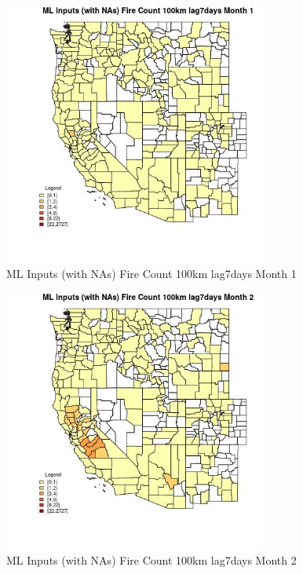 \clearpage 

\begin{figure} 
\centering  
\includegraphics[width=0.77\textwidth]{Code_Outputs/Report_ML_input_PM25_Step4_part_f_de_duplicated_aves_prioritize_24hr_obswNAs_CountyFire_Count_100km_lag7daysmedianMonth1.jpg} 
\caption{\label{fig:Report_ML_input_PM25_Step4_part_f_de_duplicated_aves_prioritize_24hr_obswNAsCountyFire_Count_100km_lag7daysmedianMonth1}ML Inputs (with NAs) Fire Count 100km lag7days Month 1} 
\end{figure} 
 

\begin{figure} 
\centering  
\includegraphics[width=0.77\textwidth]{Code_Outputs/Report_ML_input_PM25_Step4_part_f_de_duplicated_aves_prioritize_24hr_obswNAs_CountyFire_Count_100km_lag7daysmedianMonth2.jpg} 
\caption{\label{fig:Report_ML_input_PM25_Step4_part_f_de_duplicated_aves_prioritize_24hr_obswNAsCountyFire_Count_100km_lag7daysmedianMonth2}ML Inputs (with NAs) Fire Count 100km lag7days Month 2} 
\end{figure} 
 

